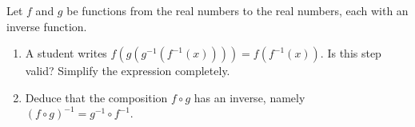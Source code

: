 Let $f$ and $g$ be functions from the real numbers to the real numbers, each with an inverse function.
\begin{enumerate}
\item[(a)] A student writes $f\left(g\left(g^{-1}\left(f^{-1}(x)\right)\right)\right)=f\left(f^{-1}(x)\right)$. Is this step valid? Simplify the expression completely.
\item[(b)] Deduce that the composition $f\circ g$ has an inverse, namely $(f\circ g)^{-1}=g^{-1}\circ f^{-1}$.
\end{enumerate}
